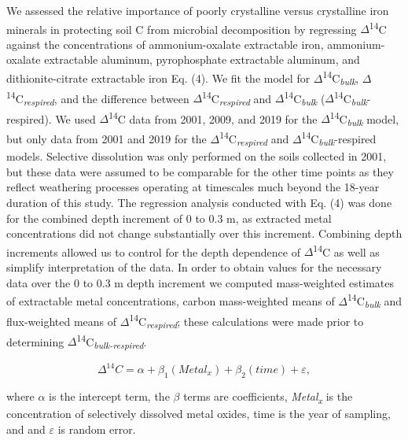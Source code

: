 \documentclass[soil, manuscript]{copernicus}
\begin{document}
We assessed the relative importance of poorly crystalline versus
crystalline iron minerals in protecting soil C from microbial
decomposition by regressing \(\Delta\)\textsuperscript{14}C against the
concentrations of ammonium-oxalate extractable iron, ammonium-oxalate
extractable aluminum, pyrophosphate extractable aluminum, and
dithionite-citrate extractable iron Eq. (4). We fit the model for
\(\Delta\)\textsuperscript{14}C\textsubscript{\emph{bulk}},
\(\Delta\)\textsuperscript{14}C\textsubscript{\emph{respired}}, and the
difference between
\(\Delta\)\textsuperscript{14}C\textsubscript{\emph{respired}} and
\(\Delta\)\textsuperscript{14}C\textsubscript{\emph{bulk}}
(\(\Delta\)\textsuperscript{14}C\textsubscript{\emph{bulk}}-respired).
We used \(\Delta\)\textsuperscript{14}C data from 2001, 2009, and 2019
for the \(\Delta\)\textsuperscript{14}C\textsubscript{\emph{bulk}}
model, but only data from 2001 and 2019 for the
\(\Delta\)\textsuperscript{14}C\textsubscript{\emph{respired}} and
\(\Delta\)\textsuperscript{14}C\textsubscript{\emph{bulk}}-respired
models. Selective dissolution was only performed on the soils collected
in 2001, but these data were assumed to be comparable for the other time
points as they reflect weathering processes operating at timescales much
beyond the 18-year duration of this study. The regression analysis
conducted with Eq. (4) was done for the combined depth increment of 0 to
0.3 m, as extracted metal concentrations did not change substantially
over this increment. Combining depth increments allowed us to control
for the depth dependence of \(\Delta\)\textsuperscript{14}C as well as
simplify interpretation of the data. In order to obtain values for the
necessary data over the 0 to 0.3 m depth increment we computed
mass-weighted estimates of extractable metal concentrations, carbon
mass-weighted means of
\(\Delta\)\textsuperscript{14}C\textsubscript{\emph{bulk}} and
flux-weighted means of
\(\Delta\)\textsuperscript{14}C\textsubscript{\emph{respired}}; these
calculations were made prior to determining
\(\Delta\)\textsuperscript{14}C\textsubscript{\emph{bulk-respired}}.

\begin{equation}
\Delta^{14}C = \alpha + \beta_{1}(Metal_{x}) + \beta_{2}(time) + \varepsilon,
\end{equation}

where \(\alpha\) is the intercept term, the \(\beta\) terms are
coefficients, \emph{Metal\textsubscript{x}} is the concentration of
selectively dissolved metal oxides, time is the year of sampling, and
and \(\varepsilon\) is random error.
\end{document}
